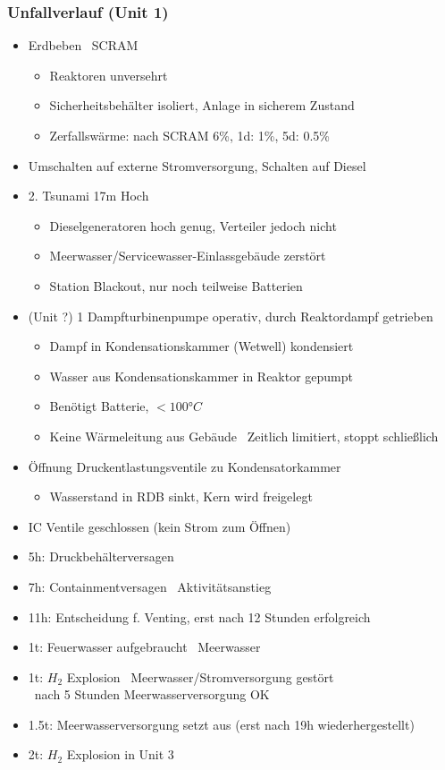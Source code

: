 \documentclass[12pt]{article}
\begin{document}
\subsubsection{Unfallverlauf (Unit 1)}
\begin{itemize}
  \item Erdbeben \textrightarrow\ SCRAM
  \begin{itemize}
    \item Reaktoren unversehrt
    \item Sicherheitsbehälter isoliert, Anlage in sicherem Zustand
    \item Zerfallswärme: nach SCRAM 6\%, 1d: 1\%, 5d: 0.5\%
  \end{itemize}
  \item Umschalten auf externe Stromversorgung, Schalten auf Diesel
  \item 2. Tsunami 17m Hoch
  \begin{itemize}
    \item Dieselgeneratoren hoch genug, Verteiler jedoch nicht
    \item Meerwasser/Servicewasser-Einlassgebäude zerstört
    \item Station Blackout, nur noch teilweise Batterien
  \end{itemize}
  \item (Unit ?) 1 Dampfturbinenpumpe operativ, durch Reaktordampf getrieben
  \begin{itemize}
    \item Dampf in Kondensationskammer (Wetwell) kondensiert
    \item Wasser aus Kondensationskammer in Reaktor gepumpt
    \item Benötigt Batterie, \(<100\text{°}C\)
    \item Keine Wärmeleitung aus Gebäude \textrightarrow\ Zeitlich limitiert, stoppt schließlich
  \end{itemize}
  \item Öffnung Druckentlastungsventile zu Kondensatorkammer
  \begin{itemize}
    \item Wasserstand in RDB sinkt, Kern wird freigelegt
  \end{itemize}
  \item IC Ventile geschlossen (kein Strom zum Öffnen)
  \item 5h: Druckbehälterversagen
  \item 7h: Containmentversagen \textrightarrow\ Aktivitätsanstieg
  \item 11h: Entscheidung f. Venting, erst nach 12 Stunden erfolgreich
  \item 1t: Feuerwasser aufgebraucht \textrightarrow\ Meerwasser
  \item 1t: \(H_2\) Explosion \textrightarrow\ Meerwasser/Stromversorgung gestört\\
  \textrightarrow\ nach 5 Stunden Meerwasserversorgung OK
  \item 1.5t: Meerwasserversorgung setzt aus (erst nach 19h wiederhergestellt)
  \item 2t: \(H_2\) Explosion in Unit 3
\end{itemize}
\end{document}
